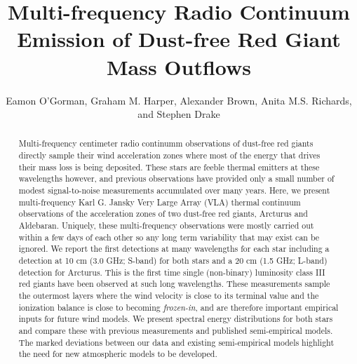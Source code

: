 \documentclass[iop]{emulateapj}
\begin{document}
\title{Multi-frequency Radio Continuum Emission of Dust-free Red Giant Mass Outflows}


\author{Eamon O'Gorman, Graham M. Harper, Alexander Brown, Anita M.S. Richards, and Stephen Drake}


\begin{abstract}

Multi-frequency centimeter radio continumm observations of dust-free red giants directly sample their wind acceleration zones where most of the energy that drives their mass loss is being deposited. These stars are feeble thermal emitters at these wavelengths however, and previous observations have provided only a small number of modest signal-to-noise measurements accumulated over many years. Here, we present multi-frequency Karl G. Jansky Very Large Array (VLA) thermal continuum observations of the acceleration zones of two dust-free red giants, Arcturus and Aldebaran. Uniquely, these multi-frequency observations were mostly carried out within a few days of each other so any long term variability that may exist can be ignored. We report the first detections at many wavelengths for each star including a detection at 10 cm (3.0 GHz; S-band) for both stars and a 20 cm (1.5 GHz; L-band) detection for Arcturus. This is the first time single (non-binary) luminosity class III red giants have been observed at such long wavelengths. These measurements sample the outermost layers where the wind velocity is close to its terminal value and the ionization balance is close to becoming \textit{frozen-in}, and are therefore important empirical inputs for future wind models. We present spectral energy distributions for both stars and compare these with previous measurements and published semi-empirical models. The marked deviations between our data and existing semi-empirical models highlight the need for new atmospheric models to be developed.

\end{abstract}
\end{document}

